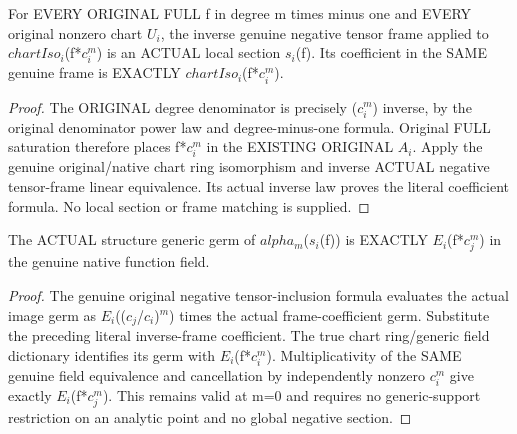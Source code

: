 \begin{definition}
\label{def:seven-native-negative-tensor-original-local-sections}
\leanok
For EVERY ORIGINAL FULL f in degree m times minus one and EVERY
original nonzero chart $U_i$, the inverse genuine negative tensor frame
applied to $chartIso_i$(f*$c_i^m$) is an ACTUAL local section $s_i$(f).
Its coefficient in the SAME genuine frame is EXACTLY $chartIso_i$(f*$c_i^m$).
\end{definition}
\begin{proof}
The ORIGINAL degree denominator is precisely ($c_i^m$) inverse, by the
original denominator power law and degree-minus-one formula. Original
FULL saturation therefore places f*$c_i^m$ in the EXISTING ORIGINAL $A_i$.
Apply the genuine original/native chart ring isomorphism and inverse
ACTUAL negative tensor-frame linear equivalence. Its actual inverse
law proves the literal coefficient formula. No local section or frame
matching is supplied.
\end{proof}

\begin{lemma}
\label{lem:seven-native-negative-tensor-original-local-germs}
\leanok
The ACTUAL structure generic germ of $alpha_m$($s_i$(f)) is EXACTLY
$E_i$(f*$c_j^m$) in the genuine native function field.
\end{lemma}
\begin{proof}
The genuine original negative tensor-inclusion formula evaluates the
actual image germ as $E_i$(($c_j$/$c_i$)$^m$) times the actual frame-coefficient
germ. Substitute the preceding literal inverse-frame coefficient.
The true chart ring/generic field dictionary identifies its germ with
$E_i$(f*$c_i^m$). Multiplicativity of the SAME genuine field equivalence
and cancellation by independently nonzero $c_i^m$ give exactly $E_i$(f*$c_j^m$).
This remains valid at m=0 and requires no generic-support restriction
on an analytic point and no global negative section.
\end{proof}

